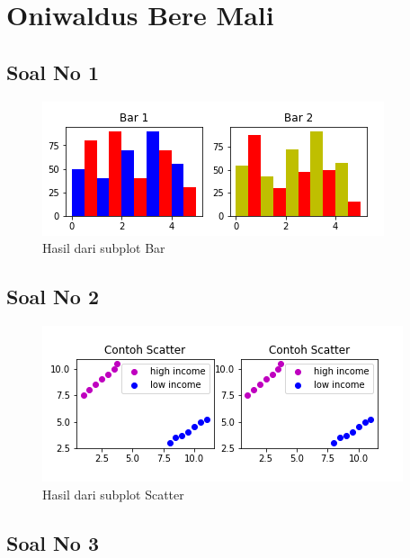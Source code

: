 \section{Oniwaldus Bere Mali}
\subsection{Soal No 1}



\begin{figure}[h]
\centering
\includegraphics[scale=0.9]{figures/6/Praktek/1174005/bar.png}
\caption{Hasil dari subplot Bar}
\label{fig:contoh}
\end{figure}

\subsection{Soal No 2}



\begin{figure}[h]
\centering
\includegraphics[scale=0.9]{figures/6/Praktek/1174005/scatter.png}
\caption{Hasil dari subplot Scatter}
\label{fig:contoh}
\end{figure}

\subsection{Soal No 3}



